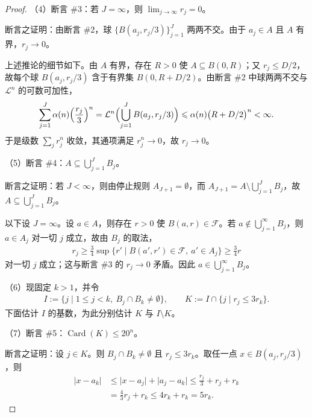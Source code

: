 \documentclass[../../main.tex]{subfiles}%
\begin{document}
\begin{proof}
（4）断言 \#3：若 $J=\infty$，则 $\lim_{j\to\infty}r_j=0$。

断言之证明：由断言 \#2，球 $\{B(a_j,r_j/3)\}_{j=1}^{J}$ 两两不交。由于 $a_j\in A$ 且 $A$ 有界，$r_j\to0$。

上述推论的细节如下。由 $A$ 有界，存在 $R>0$ 使 $A\subseteq B(0,R)$；又 $r_j\leqslant D/2$，故每个球 $B(a_j,r_j/3)$ 含于有界集 $B(0,R+D/2)$。由断言 \#2 中球两两不交与 $\mathcal{L}^n$ 的可数可加性，
\begin{align*}
\sum_{j=1}^{J}\alpha(n)\Bigl(\frac{r_j}{3}\Bigr)^{n}
=\mathcal{L}^n\Bigl(\bigcup_{j=1}^{J}B(a_j,r_j/3)\Bigr)
\leqslant\alpha(n)\bigl(R+D/2\bigr)^{n}<\infty .
\end{align*}
于是级数 $\sum_j r_j^{n}$ 收敛，其通项满足 $r_j^{n}\to0$，故 $r_j\to0$。

（5）断言 \#4：$A\subseteq\bigcup_{j=1}^{J}B_j$。

断言之证明：若 $J<\infty$，则由停止规则 $A_{J+1}=\emptyset$，而 $A_{J+1}=A\setminus\bigcup_{j=1}^{J}B_j$，故 $A\subseteq\bigcup_{j=1}^{J}B_j$。

以下设 $J=\infty$。设 $a\in A$，则存在 $r>0$ 使 $B(a,r)\in\mathcal{F}$。若 $a\notin\bigcup_{j=1}^{\infty}B_j$，则 $a\in A_j$ 对一切 $j$ 成立，故由 $B_j$ 的取法，
\begin{align*}
r_j\geqslant\frac{3}{4}\sup\{r'\mid B(a',r')\in\mathcal{F},\ a'\in A_j\}\geqslant\frac{3}{4}r
\end{align*}
对一切 $j$ 成立；这与断言 \#3 的 $r_j\to0$ 矛盾。因此 $a\in\bigcup_{j=1}^{\infty}B_j$。

（6）现固定 $k>1$，并令
\begin{align*}
I:=\{j\mid 1\leqslant j<k,\ B_j\cap B_k\neq\emptyset\},\qquad
K:=I\cap\{j\mid r_j\leqslant3r_k\}.
\end{align*}
下面估计 $I$ 的基数，为此分别估计 $K$ 与 $I\setminus K$。

（7）断言 \#5：$\operatorname{Card}(K)\leqslant20^{n}$。

断言之证明：设 $j\in K$。则 $B_j\cap B_k\neq\emptyset$ 且 $r_j\leqslant3r_k$。取任一点 $x\in B(a_j,r_j/3)$，则
\begin{align*}
\lvert x-a_k\rvert&\leqslant\lvert x-a_j\rvert+\lvert a_j-a_k\rvert\leqslant\frac{r_j}{3}+r_j+r_k\\
&=\frac{4}{3}r_j+r_k\leqslant4r_k+r_k=5r_k .
\end{align*}


\end{proof}
\end{document}
